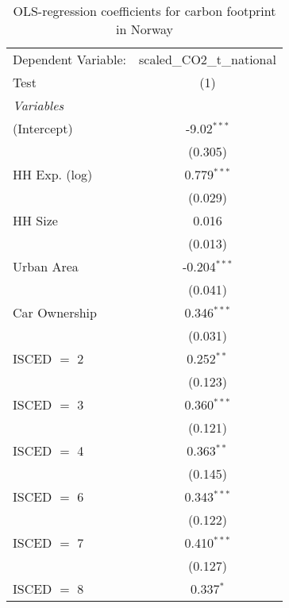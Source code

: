 
\begin{table}[htbp!]
   \centering
   \small
   \begin{adjustbox}{width = 1\textwidth, max height = 0.95\textheight, center}
      \begin{threeparttable}[b]
         \caption{\label{tab:OLS_2_NOR} OLS-regression coefficients for carbon footprint in Norway}
         \begin{tabular}{lc}
            \tabularnewline \midrule \midrule
            Dependent Variable: & scaled\_CO2\_t\_national\\     
            Test                & (1)\\  
            \midrule
            \emph{Variables}\\
            (Intercept)         & -9.02$^{***}$\\   
                                & (0.305)\\   
            HH Exp. (log)       & 0.779$^{***}$\\   
                                & (0.029)\\   
            HH Size             & 0.016\\   
                                & (0.013)\\   
            Urban Area          & -0.204$^{***}$\\   
                                & (0.041)\\   
            Car Ownership       & 0.346$^{***}$\\   
                                & (0.031)\\   
            ISCED $=$ 2         & 0.252$^{**}$\\   
                                & (0.123)\\   
            ISCED $=$ 3         & 0.360$^{***}$\\   
                                & (0.121)\\   
            ISCED $=$ 4         & 0.363$^{**}$\\   
                                & (0.145)\\   
            ISCED $=$ 6         & 0.343$^{***}$\\   
                                & (0.122)\\   
            ISCED $=$ 7         & 0.410$^{***}$\\   
                                & (0.127)\\   
            ISCED $=$ 8         & 0.337$^{*}$\\   

\end{tabular}
\end{threeparttable}
\end{adjustbox}
\end{table}
